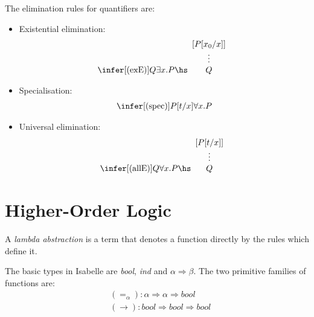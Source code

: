 \documentclass{article}
\begin{document}
\begin{definition}
	The elimination rules for quantifiers are:
	\begin{itemize}
		\item Existential elimination: \begin{align*}
			      \infer[(\text{exE})]{Q}{\exists x.P\hs \begin{array}[b]{c}
					                                             [P[x_0/x]] \\
					                                             \vdots     \\
					                                             Q
				                                             \end{array}}
		      \end{align*}
		\item Specialisation: \begin{align*}
			      \infer[(\text{spec})]{P[t/x]}{\forall x.P}
		      \end{align*}
		\item Universal elimination: \begin{align*}
			      \infer[(\text{allE})]{Q}{\forall x.P\hs \begin{array}[b]{c}
					                                              [P[t/x]] \\
					                                              \vdots   \\
					                                              Q
				                                              \end{array}}
		      \end{align*}
	\end{itemize}
\end{definition}

\section{Higher-Order Logic}

\begin{definition}
	A \emph{lambda abstraction} is a term that denotes a function directly by the
	rules which define it.
\end{definition}

\begin{definition}
	The basic types in Isabelle are \emph{bool}, \emph{ind} and $\alpha\Rightarrow\beta$.
	The two primitive families of functions are:
	\begin{align*}
		 & (=_\alpha): \alpha\Rightarrow \alpha \Rightarrow \textit{bool}                \\
		 & (\rightarrow): \textit{bool} \Rightarrow\textit{bool}\Rightarrow\textit{bool}
	\end{align*}
\end{definition}
\end{document}
